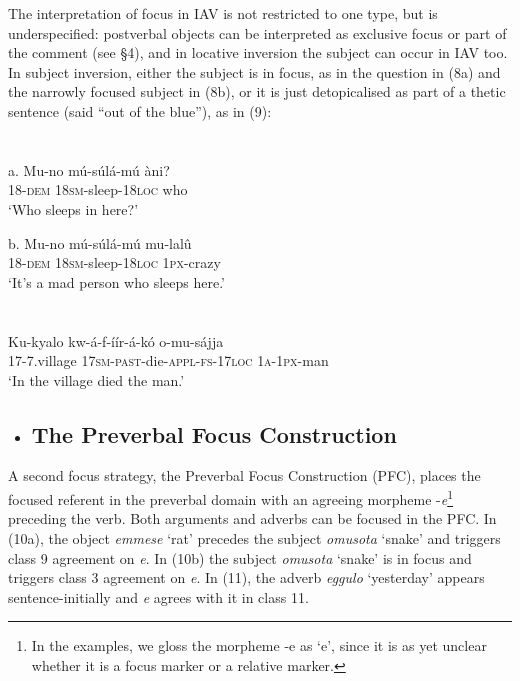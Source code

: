 \documentclass[output=paper]{langsci/langscibook}
\begin{document}
The interpretation of focus in IAV is not restricted to one type, but is underspecified: postverbal objects can be interpreted as exclusive focus or part of the comment (see §4), and in locative inversion the subject can occur in IAV too. In subject inversion, either the subject is in focus, as in the question in (8a) and the narrowly focused subject in (8b), or it is just detopicalised as part of a thetic sentence (said “out of the blue”), as in (9):

\chapter{}
\gll a.  Mu-no    mú-súlá-mú    àni?\\
       18-\textsc{dem}  \textsc{18sm}{}-sleep-\textsc{18loc}  who\\
\glt   ‘Who sleeps in here?’
\z

\gll b.  Mu-no    mú-súlá-mú    mu-lalû\\
       18-\textsc{dem}  1\textsc{8sm}{}-sleep-\textsc{18loc}  \textsc{1px}{}-crazy\\
\glt   ‘It’s a mad person who sleeps here.’
\z

\chapter{}
\gll Ku-kyalo  kw-á-f-íír-á-kó      o-mu-sájja\\
     17-7.village  \textsc{17sm}{}-\textsc{past}{}-die-\textsc{appl}{}-\textsc{fs}{}-\textsc{17loc}  \textsc{1a-1px}{}-man\\
\glt ‘In the village died the man.’
\z

\begin{itemize}
\item \section{ \label{bkm:Ref297362424}The Preverbal Focus Construction}
\end{itemize}

A second focus strategy, the Preverbal Focus Construction (PFC), places the focused referent in the preverbal domain with an agreeing morpheme -\textit{e}\footnote{ In the examples, we gloss the morpheme -e as ‘e’, since it is as yet unclear whether it is a focus marker or a relative marker.}{ }preceding the verb. Both arguments and adverbs can be focused in the PFC. In (10a), the object \textit{emmese} ‘rat’ precedes the subject \textit{omusota} ‘snake’ and triggers class 9 agreement on \textit{e}. In (10b) the subject \textit{omusota} ‘snake’ is in focus and triggers class 3 agreement on \textit{e}. In (11), the adverb \textit{eggulo} ‘yesterday’ appears sentence-initially and \textit{e }agrees with it in class 11.
\end{document}
